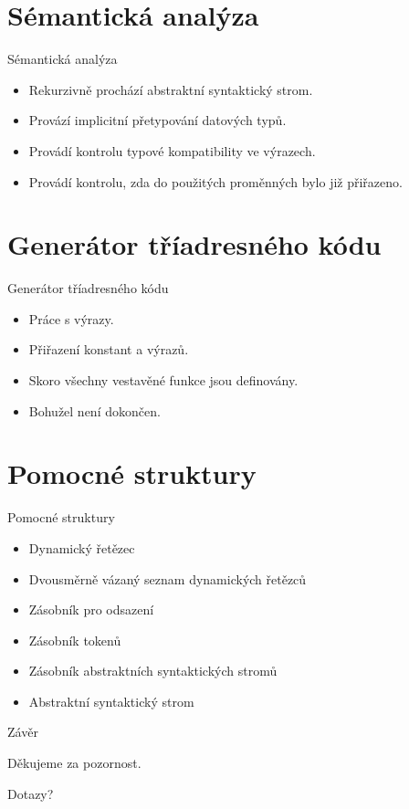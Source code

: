 \documentclass[12pt]{beamer}
\begin{document}
\section{Sémantická analýza}
\begin{frame}{Sémantická analýza}
\begin{itemize}
\item Rekurzivně prochází abstraktní syntaktický strom.
\item Provází implicitní přetypování datových typů.
\item Provádí kontrolu typové kompatibility ve výrazech.
\item Provádí kontrolu, zda do použitých proměnných bylo již přiřazeno.
\end{itemize}
\end{frame}

\section{Generátor tříadresného kódu}
\begin{frame}{Generátor tříadresného kódu}
\begin{itemize}
\item Práce s výrazy.
\item Přiřazení konstant a výrazů.
\item Skoro všechny vestavěné funkce jsou definovány.
\item Bohužel není dokončen. %
\end{itemize}
\end{frame}

\section{Pomocné struktury}
\begin{frame}{Pomocné struktury}
\begin{itemize}
\item Dynamický řetězec
\item Dvousměrně vázaný seznam dynamických řetězců
\item Zásobník pro odsazení
\item Zásobník tokenů
\item Zásobník abstraktních syntaktických stromů
\item Abstraktní syntaktický strom
\end{itemize}
\end{frame}

\begin{frame}{Závěr}
\begin{center}
    \begin{huge}
    Děkujeme za pozornost. \\[8mm]
    \end{huge}
    \large{Dotazy?}
  \end{center}
\end{frame}
\end{document}
